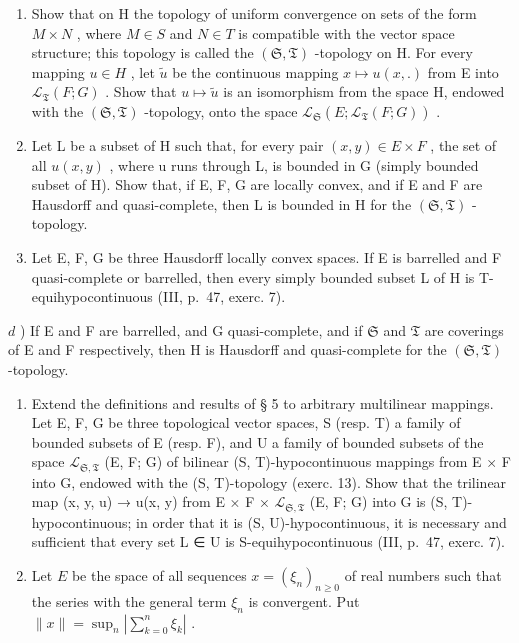 \begin{enumerate}
\def\labelenumi{\alph{enumi})}
\item
  Show that on H the topology of uniform convergence on sets of the form \(M \times N\) , where \(M \in S\) and \(N \in T\) is compatible with the vector space structure; this topology is called the \((\mathfrak{S}, \mathfrak{T})\) -topology on H. For every mapping \(u \in H\) , let \(\tilde{u}\) be the continuous mapping \(x \mapsto u(x, .)\) from E into \(\mathcal{L}_{\mathfrak{T}}(F; G)\) . Show that \(u \mapsto \tilde{u}\) is an isomorphism from the space H, endowed with the \((\mathfrak{S}, \mathfrak{T})\) -topology, onto the space \(\mathcal{L}_{\mathfrak{S}}(E; \mathcal{L}_{\mathfrak{T}}(F; G))\) .
\item
  Let L be a subset of H such that, for every pair \((x, y) \in E \times F\) , the set of all \(u(x, y)\) , where u runs through L, is bounded in G (simply bounded subset of H). Show that, if E, F, G are locally convex, and if E and F are Hausdorff and quasi-complete, then L is bounded in H for the \((\mathfrak{S}, \mathfrak{T})\) -topology.
\item
  Let E, F, G be three Hausdorff locally convex spaces. If E is barrelled and F quasi-complete or barrelled, then every simply bounded subset L of H is T-equihypocontinuous (III, p.~47, exerc. 7).
\end{enumerate}

\(d\) ) If E and F are barrelled, and G quasi-complete, and if \(\mathfrak{S}\) and \(\mathfrak{T}\) are coverings of E and F respectively, then H is Hausdorff and quasi-complete for the \((\mathfrak{S},\mathfrak{T})\) -topology.

\begin{enumerate}
\def\labelenumi{\arabic{enumi})}
\setcounter{enumi}{13}
\item
  Extend the definitions and results of § 5 to arbitrary multilinear mappings. Let E, F, G be three topological vector spaces, S (resp. T) a family of bounded subsets of E (resp. F), and U a family of bounded subsets of the space \(\mathcal{L}_{\mathfrak{S},\mathfrak{T}}\) (E, F; G) of bilinear (S, T)-hypocontinuous mappings from E × F into G, endowed with the (S, T)-topology (exerc. 13). Show that the trilinear map (x, y, u) → u(x, y) from E × F × \(\mathcal{L}_{\mathfrak{S},\mathfrak{T}}\) (E, F; G) into G is (S, T)-hypocontinuous; in order that it is (S, U)-hypocontinuous, it is necessary and sufficient that every set L ∈ U is S-equihypocontinuous (III, p.~47, exerc. 7).
\item
  Let \(E\) be the space of all sequences \(x = (\xi_n)_{n \geqslant 0}\) of real numbers such that the series with the general term \(\xi_n\) is convergent. Put \(\| x \| = \sup_n | \sum_{k=0}^n \xi_k |\) .
\end{enumerate}

